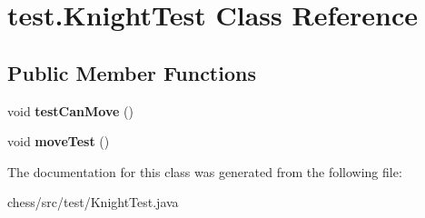 \hypertarget{classtest_1_1_knight_test}{}\section{test.\+Knight\+Test Class Reference}
\label{classtest_1_1_knight_test}
\subsection*{Public Member Functions}
\begin{DoxyCompactItemize}
\item 
\mbox{\label{classtest_1_1_knight_test_a2405ab5a98a7e92aa90196b5623fbd8d}} 
void {\bfseries test\+Can\+Move} ()
\item 
\mbox{\label{classtest_1_1_knight_test_af0f594954e8eec8f969bc8d97f09d83c}} 
void {\bfseries move\+Test} ()
\end{DoxyCompactItemize}


The documentation for this class was generated from the following file\+:\begin{DoxyCompactItemize}
\item 
chess/src/test/Knight\+Test.\+java\end{DoxyCompactItemize}
